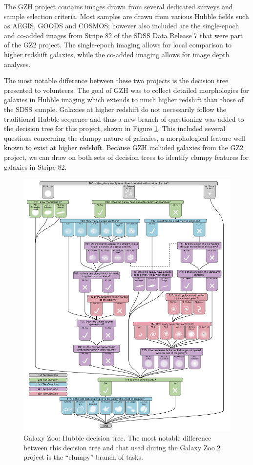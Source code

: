 The GZH project contains images drawn from several dedicated surveys and sample selection criteria. Most samples are drawn from various Hubble fields such as AEGIS, GOODS and COSMOS; however also included are the single-epoch and co-added images from Stripe 82 of the SDSS Data Release 7 that were part of the GZ2 project. The single-epoch imaging allows for local comparison to higher redshift galaxies, while the co-added imaging allows for image depth analyses. 

The most notable difference between these two projects is the decision tree presented to volunteers. The goal of GZH was to collect detailed morphologies for galaxies in Hubble imaging which extends to much higher redshift than those of the SDSS sample. Galaxies at higher redshift do not necessarily follow the traditional Hubble sequence and thus a new branch of questioning was added to the decision tree for this project, shown in Figure \ref{fig: gzh decision tree}. This included several questions concerning the clumpy nature of galaxies, a morphological feature well known to exist at higher redshift. Because GZH included galaxies from the GZ2 project, we can draw on both sets of decision trees to identify clumpy features for galaxies in Stripe 82.

\begin{figure}
\includegraphics[width=\textwidth]{Figures/gz3_tree_resized.pdf}
\caption[Galaxy Zoo: Hubble decision tree.]{Galaxy Zoo: Hubble decision tree. The most notable difference between this decision tree and that used during the Galaxy Zoo 2 project is the ``clumpy'' branch of tasks.}
\label{fig: gzh decision tree}
\end{figure}


